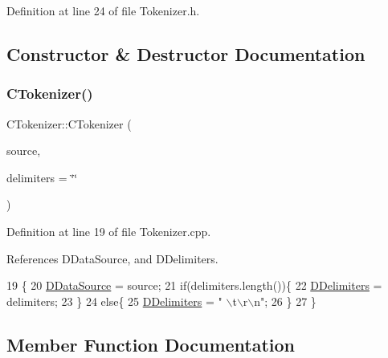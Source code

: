 Definition at line 24 of file Tokenizer.\+h.



\subsection{Constructor \& Destructor Documentation}
\hypertarget{classCTokenizer_abb6403c9fb2fe0e5d2a4349d7bcbf3ef}{}\label{classCTokenizer_abb6403c9fb2fe0e5d2a4349d7bcbf3ef} 
\subsubsection{\texorpdfstring{C\+Tokenizer()}{CTokenizer()}}
{\footnotesize\ttfamily C\+Tokenizer\+::\+C\+Tokenizer (\begin{DoxyParamCaption}\item[{std\+::shared\+\_\+ptr$<$ \hyperlink{classCDataSource}{C\+Data\+Source} $>$}]{source,  }\item[{const std\+::string}]{delimiters = {\ttfamily \char`\"{}\char`\"{}} }\end{DoxyParamCaption})}



Definition at line 19 of file Tokenizer.\+cpp.



References D\+Data\+Source, and D\+Delimiters.


\begin{DoxyCode}
19                                                                                      \{
20     \hyperlink{classCTokenizer_aaa6faab432000d3f942a0c14fc09f60b}{DDataSource} = source;
21     \textcolor{keywordflow}{if}(delimiters.length())\{
22         \hyperlink{classCTokenizer_ad1edcf297f5f9ccf43dc32a992556f52}{DDelimiters} = delimiters;
23     \}
24     \textcolor{keywordflow}{else}\{
25         \hyperlink{classCTokenizer_ad1edcf297f5f9ccf43dc32a992556f52}{DDelimiters} = \textcolor{stringliteral}{" \(\backslash\)t\(\backslash\)r\(\backslash\)n"};
26     \}
27 \}
\end{DoxyCode}


\subsection{Member Function Documentation}
\hypertarget{classCTokenizer_ab3afe12900a14497129426e46d9f65d9}{}\label{classCTokenizer_ab3afe12900a14497129426e46d9f65d9} 
